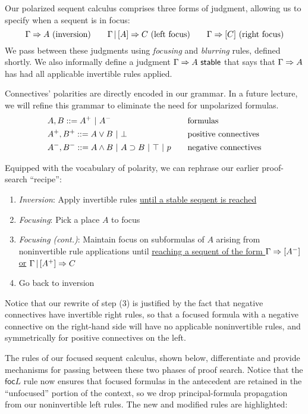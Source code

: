 \documentclass{article}
\newcommand{\bnfor}{\ |\ }
\newcommand{\focsep}{\,|\,}
\begin{document}
Our polarized sequent calculus comprises three forms of judgment, allowing us to specify when a
sequent is in focus:
\[
  \Gamma \proves A \text{ (inversion)} \qquad
  \Gamma \focsep [A] \proves C \text{ (left focus)} \qquad
  \Gamma \proves [C] \text{ (right focus)}
\]
We pass between these judgments using \emph{focusing} and \emph{blurring} rules, defined shortly. We
also informally define a judgment $\Gamma \Rightarrow A \textsf{ stable}$ that says that $\Gamma \Rightarrow
A$ has had all applicable invertible rules applied.

Connectives' polarities are directly encoded in our grammar. In a future lecture, we will refine
this grammar to eliminate the need for unpolarized formulas.
\begin{alignat*}{2}
  &A, B ::= A^+ \bnfor A^- &&\text{formulas}\\
  &A^+, B^+ ::= A \lor B \bnfor \bot &&\text{positive connectives}\\
  &A^-, B^- ::= A \land B \bnfor A \imp B \bnfor \top \bnfor p \quad &&\text{negative connectives}
\end{alignat*}

Equipped with the vocabulary of polarity, we can rephrase our earlier proof-search ``recipe'':

\begin{enumerate}
  \item \emph{Inversion}: Apply invertible rules \underline{until a stable sequent is reached}
  \item \emph{Focusing}: Pick a place $A$ to focus
  \item \emph{Focusing (cont.)}: Maintain focus on subformulas of $A$ arising from noninvertible
  rule applications until \underline{reaching a sequent of the form $\Gamma \Rightarrow [A^-]$ or}
  \underline{$\Gamma \focsep [A^+] \proves C$}
  \item Go back to inversion
\end{enumerate}

Notice that our rewrite of step (3) is justified by the fact that negative connectives have
invertible right rules, so that a focused formula with a negative connective on the right-hand side
will have no applicable noninvertible rules, and symmetrically for positive connectives on the left.

The rules of our focused sequent calculus, shown below, differentiate and provide mechanisms for
passing between these two phases of proof search. Notice that the $\mathsf{foc} L$ rule now ensures
that focused formulas in the antecedent are retained in the ``unfocused'' portion of the context, so
we drop principal-formula propagation from our noninvertible left rules. The new and modified rules
are highlighted:
\end{document}
